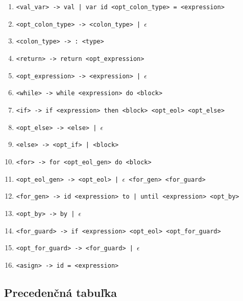 \documentclass{article}
\begin{document}
\begin{enumerate}[label=\arabic*., leftmargin=2.2em, itemsep=1pt, parsep=0pt]
  \item \texttt{<val\_var> -> val | var id <opt\_colon\_type> = <expression>}
  \item \texttt{<opt\_colon\_type> -> <colon\_type> | $\epsilon$}
  \item \texttt{<colon\_type> -> : <type>}
  \item \texttt{<return> -> return <opt\_expression>}
  \item \texttt{<opt\_expression> -> <expression> | $\epsilon$}
  \item \texttt{<while> -> while <expression> do <block>}
  \item \texttt{<if> -> if <expression> then <block> <opt\_eol> <opt\_else>}
  \item \texttt{<opt\_else> -> <else> | $\epsilon$}
  \item \texttt{<else> -> <opt\_if> | <block>}
  \item \texttt{<for> -> for <opt\_eol\_gen> do <block>}
  \item \texttt{<opt\_eol\_gen> -> <opt\_eol> | $\epsilon$ <for\_gen> <for\_guard>}
  \item \texttt{<for\_gen> -> id <expression> to | until <expression> <opt\_by>}
  \item \texttt{<opt\_by> -> by | $\epsilon$}
  \item \texttt{<for\_guard> -> if <expression> <opt\_eol> <opt\_for\_guard>}
  \item \texttt{<opt\_for\_guard> -> <for\_guard> | $\epsilon$}
  \item \texttt{<asign> -> id = <expression>}
\end{enumerate}

\clearpage
\subsection{Precedenčná tabuľka}
\label{sec:precedencna-tabulka}
\end{document}
